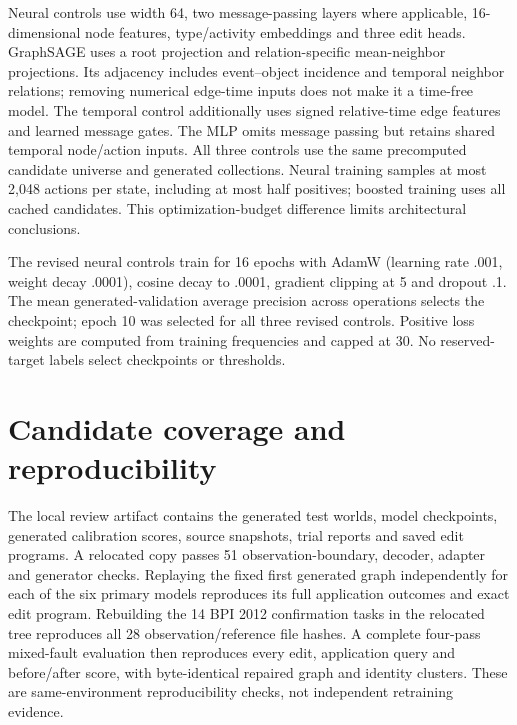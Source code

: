 \documentclass[11pt]{article}
\begin{document}
Neural controls use width 64, two message-passing layers where applicable, 16-dimensional node features, type/activity embeddings and three edit heads. GraphSAGE uses a root projection and relation-specific mean-neighbor projections. Its adjacency includes event--object incidence and temporal neighbor relations; removing numerical edge-time inputs does not make it a time-free model. The temporal control additionally uses signed relative-time edge features and learned message gates. The MLP omits message passing but retains shared temporal node/action inputs. All three controls use the same precomputed candidate universe and generated collections. Neural training samples at most 2,048 actions per state, including at most half positives; boosted training uses all cached candidates. This optimization-budget difference limits architectural conclusions.

The revised neural controls train for 16 epochs with AdamW (learning rate .001, weight decay .0001), cosine decay to .0001, gradient clipping at 5 and dropout .1. The mean generated-validation average precision across operations selects the checkpoint; epoch 10 was selected for all three revised controls. Positive loss weights are computed from training frequencies and capped at 30. No reserved-target labels select checkpoints or thresholds.

\section{Candidate coverage and reproducibility}





The local review artifact contains the generated test worlds, model checkpoints, generated calibration scores, source snapshots, trial reports and saved edit programs. A relocated copy passes 51 observation-boundary, decoder, adapter and generator checks. Replaying the fixed first generated graph independently for each of the six primary models reproduces its full application outcomes and exact edit program. Rebuilding the 14 BPI 2012 confirmation tasks in the relocated tree reproduces all 28 observation/reference file hashes. A complete four-pass mixed-fault evaluation then reproduces every edit, application query and before/after score, with byte-identical repaired graph and identity clusters. These are same-environment reproducibility checks, not independent retraining evidence.
\end{document}
